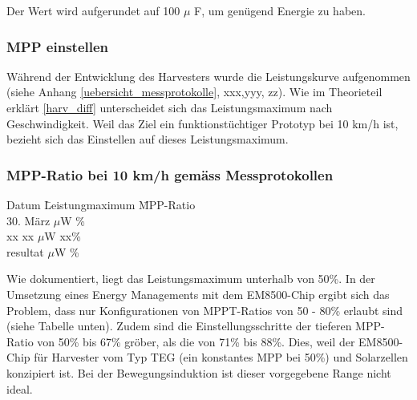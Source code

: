 Der Wert wird aufgerundet auf 100 $\mu$ F, um genügend Energie zu haben.

\subsubsection*{MPP einstellen}


Während der Entwicklung des Harvesters wurde die Leistungskurve aufgenommen (siehe Anhang \ref{uebersicht_messprotokolle}, xxx,yyy, zz). Wie im Theorieteil erklärt \ref{harv_diff} unterscheidet sich das Leistungsmaximum nach Geschwindigkeit. Weil das Ziel ein funktionstüchtiger Prototyp bei 10 km/h ist, bezieht sich das Einstellen auf dieses Leistungsmaximum.  

 
\subsubsection*{MPP-Ratio bei 10 km/h gemäss Messprotokollen}
\begin{tabbing}
    Datum       \quad\= Leistungmaximum    \quad\= MPP-Ratio\\[0.8ex]
    30. März     $\mu$W        \thinspace\% \\
    xx          \> xx $\mu$W        \> xx\thinspace\%\\
    resultat      $\mu$W    \thinspace\%\\
\end{tabbing}


Wie dokumentiert, liegt das Leistungsmaximum unterhalb von 50\thinspace\%. In der Umsetzung eines Energy Managements mit dem EM8500-Chip ergibt sich das Problem, dass nur Konfigurationen von MPPT-Ratios von 50 - 80\thinspace\% erlaubt sind (siehe Tabelle unten). Zudem sind die Einstellungsschritte der tieferen MPP-Ratio von 50\thinspace\% bis 67\thinspace\% gröber, als die von 71\thinspace\% bis 88\thinspace\%. Dies, weil der EM8500-Chip für Harvester vom Typ TEG (ein konstantes MPP bei 50\thinspace\%) und Solarzellen konzipiert ist. Bei der Bewegungsinduktion ist dieser vorgegebene Range nicht ideal.

